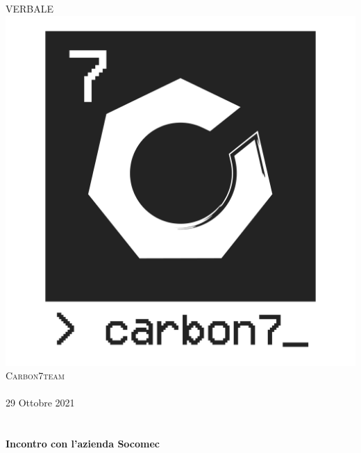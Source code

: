 \begin{center}
    \textsc{\huge VERBALE}\\[0.75cm] 
    \includegraphics[scale=0.25]{res/images/carbon7_small_logo-07.png}\\[1cm]
    \textsc{\Large Carbon7team}\\[0.3cm]
    \\[0.5cm]
    {\large 29 Ottobre 2021}\\[0.5cm]
    \\[0.5cm]

    \HRule \\[0.4cm]
    {\huge \bfseries Incontro con l'azienda Socomec}\\[0.2cm]
    \HRule \\[1.5cm]


\end{center}
